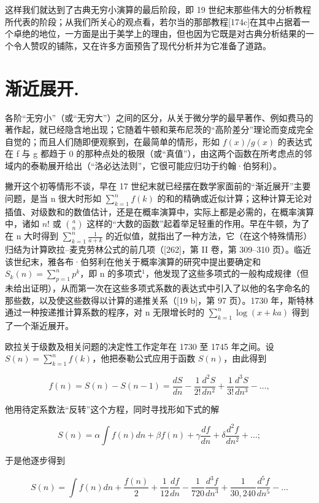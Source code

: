这样我们就达到了古典无穷小演算的最后阶段，即 19 世纪末那些伟大的分析教程所代表的阶段；从我们所关心的观点看，若尔当的那部教程{[}174c{]}在其中占据着一个卓绝的地位，一方面是出于美学上的理由，但也因为它既是对古典分析结果的一个令人赞叹的铺陈，又在许多方面预告了现代分析并为它准备了道路。

\chapter{渐近展开.}

各阶“无穷小”（或“无穷大”）之间的区分，从关于微分学的最早著作、例如费马的著作起，就已经隐含地出现；它随着牛顿和莱布尼茨的“高阶差分”理论而变成完全自觉的；而且人们随即便观察到，在最简单的情形，形如 \(f(x)/g(x)\) 的表达式在 f 与 g 都趋于 0 的那种点处的极限（或“真值”），由这两个函数在所考虑点的邻域内的泰勒展开给出（“洛必达法则”，它很可能应归功于约翰·伯努利）。

撇开这个初等情形不谈，早在 17 世纪末就已经摆在数学家面前的“渐近展开”主要问题，是当 n 很大时形如 \(\sum_{k=1}^{n}f(k)\) 的和的精确或近似计算；这种计算无论对插值、对级数和的数值估计，还是在概率演算中，实际上都是必需的，在概率演算中，诸如 \(n!\) 或 \(\binom{a}{n}\) 这样的“大数的函数”起着举足轻重的作用。早在牛顿，为了在 n 大时得到 \(\sum_{k=1}^{n}\frac{1}{a+k}\) 的近似值，就指出了一种方法，它（在这个特殊情形）归结为计算欧拉–麦克劳林公式的前几项（{[}262{]}，第 II 卷，第 309–310 页）。临近该世纪末，雅各布·伯努利在他关于概率演算的研究中提出要确定和 \(S_{k}(n)=\sum_{p=1}^{n}p^{k}\)，即 n 的多项式\(^{1}\)，他发现了这些多项式的一般构成规律（但未给出证明），从而第一次在这些多项式系数的表达式中引入了以他的名字命名的那些数，以及使这些数得以计算的递推关系（{[}19 b{]}，第 97 页）。1730 年，斯特林通过一种按递推计算系数的程序，对 n 无限增长时的 \(\sum_{k=1}^{n}\log(x+ka)\) 得到了一个渐近展开。

欧拉关于级数及相关问题的决定性工作定年在 1730 至 1745 年之间。设 \(S(n) = \sum_{k=1}^{n} f(k)\)，他把泰勒公式应用于函数 \(S(n)\)，由此得到

\[
f (n) = S (n) - S (n - 1) = \frac {d S}{d n} - \frac {1}{2 !} \frac {d ^ {2} S}{d n ^ {2}} + \frac {1}{3 !} \frac {d ^ {3} S}{d n ^ {3}} - \dots ,
\]

他用待定系数法“反转”这个方程，同时寻找形如下式的解

\[
S (n) = \alpha \int f (n) d n + \beta f (n) + \gamma \frac {d f}{d n} + \delta \frac {d ^ {2} f}{d n ^ {2}} + \dots ;
\]

于是他逐步得到

\[
S (n) = \int f (n) d n + \frac {f (n)}{2} + \frac {1}{12} \frac {d f}{d n} - \frac {1}{720} \frac {d ^ {3} f}{d n ^ {3}} + \frac {1}{30,240} \frac {d ^ {5} f}{d n ^ {5}} - \dots
\]

